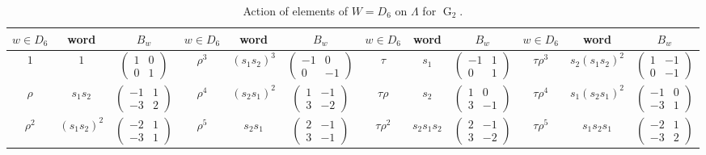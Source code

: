 \documentclass[11pt,english]{amsart}
\numberwithin{equation}{section}
\numberwithin{figure}{section}
\theoremstyle{plain}
\theoremstyle{plain}
\theoremstyle{definition}
\theoremstyle{remark}
\newcommand{\G}{\operatorname{G}}
\begin{document}
\begin{table}[H]
\scriptsize
\centering
\vspace{0.2cm}
\setlength{\tabcolsep}{4pt}
\begin{tabular}{|c|c|c||c|c|c||c|c|c||c|c|c|}
\hline
$w\in D_6$ & word & $B_w$ & $w\in D_6$ & word & $B_w$ & $w\in D_6$ & word & $B_w$ & $w\in D_6$ & word & $B_w$ \\ 
\hline
$1$ & $1$ & $\begin{pmatrix} 1 & 0 \\ 0 & 1 \end{pmatrix}$ & $\rho^3$ & $(s_1 s_2)^3$ & $\begin{pmatrix} -1 & 0 \\ 0 & -1 \end{pmatrix}$ & $\tau$ & $s_1$ & $\begin{pmatrix} -1 & 1 \\ 0 & 1 \end{pmatrix}$ & $\tau\rho^3$ & $s_2 (s_1 s_2)^2$ & $\begin{pmatrix} 1 & -1 \\ 0 & -1 \end{pmatrix}$ \\\hline
$\rho$ & $s_1 s_2$ & $\begin{pmatrix} -1 & 1 \\ -3 & 2 \end{pmatrix}$ & $\rho^4$ & $(s_2 s_1)^2$ & $\begin{pmatrix} 1 & -1 \\ 3 & -2 \end{pmatrix}$ & $\tau\rho$ & $s_2$ & $\begin{pmatrix} 1 & 0 \\ 3 & -1 \end{pmatrix}$ & $\tau\rho^4$ & $s_1 (s_2 s_1)^2$ & $\begin{pmatrix} -1 & 0 \\ -3 & 1 \end{pmatrix}$ \\\hline
$\rho^2$ & $(s_1 s_2)^2$ & $\begin{pmatrix} -2 & 1 \\ -3 & 1 \end{pmatrix}$ & $\rho^5$ & $s_2 s_1$ & $\begin{pmatrix} 2 & -1 \\ 3 & -1 \end{pmatrix}$ & $\tau\rho^2$ & $s_2 s_1 s_2$ & $\begin{pmatrix} 2 & -1 \\ 3 & -2 \end{pmatrix}$ & $\tau\rho^5$ & $s_1s_2s_1$ & $\begin{pmatrix} -2 & 1 \\ -3 & 2 \end{pmatrix}$ \\\hline
\end{tabular}
\caption{Action of elements of $W=D_6$ on $\Lambda$ for $\G_2$.}
\label{tab:G2_action}
\end{table}
\end{document}
